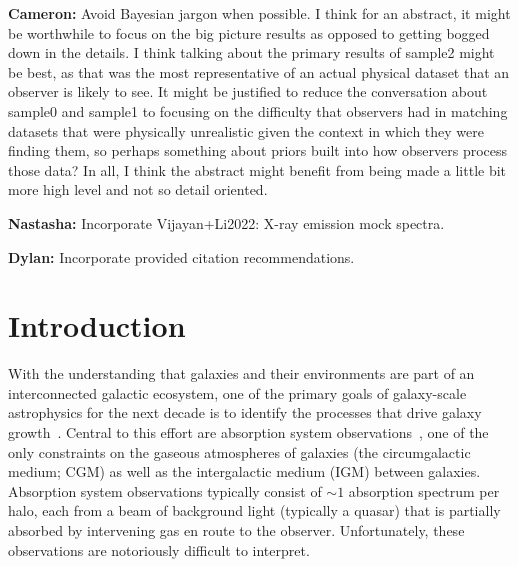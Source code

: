 \documentclass[fleqn,usenatbib]{mnras}
\begin{document}
\textbf{Cameron:}
Avoid Bayesian jargon when possible.
I think for an abstract, it might be worthwhile to focus on the big picture results as opposed to getting bogged down in the details.  I think talking about the primary results of sample2 might be best, as that was the most representative of an actual physical dataset that an observer is likely to see.  It might be justified to reduce the conversation about sample0 and sample1 to focusing on the difficulty that observers had in matching datasets that were physically unrealistic given the context in which they were finding them, so perhaps something about priors built into how observers process those data?  In all, I think the abstract might benefit from being made a little bit more high level and not so detail oriented.

\textbf{Nastasha:}
Incorporate Vijayan+Li2022: X-ray emission mock spectra.

\textbf{Dylan:}
Incorporate provided citation recommendations.

\section{Introduction}

With the understanding that galaxies and their environments are part of an interconnected galactic ecosystem, one of the primary goals of galaxy-scale astrophysics for the next decade is to identify the processes that drive galaxy growth~\citep{Decadal2020}.
Central to this effort are absorption system observations~\citep[e.g.][]{Bahcall1993, Lanzetta1995, Lauroesch1996, Churchill1996}, one of the only constraints on the gaseous atmospheres of galaxies (the circumgalactic medium; CGM) as well as the intergalactic medium (IGM) between galaxies.
Absorption system observations typically consist of $\sim 1$ absorption spectrum per halo, each from a beam of background light (typically a quasar) that is partially absorbed by intervening gas en route to the observer.
Unfortunately, these observations are notoriously difficult to interpret.
\end{document}
